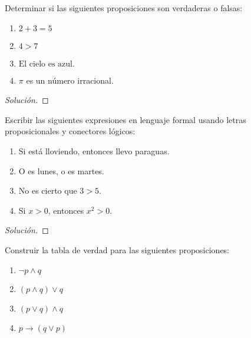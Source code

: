 \documentclass[a4,11pt]{aleph-notas}
\begin{document}
\encabezado

\begin{ejer}
    Determinar si las siguientes proposiciones son verdaderas o falsas:
    \begin{multicols}{2}
    \begin{enumerate}[label=\textit{\alph*)}]
        \item $2 + 3 = 5$
        \item $4 > 7$
        \item $\text{El cielo es azul.}$
        \item $\pi$ es un número irracional.
    \end{enumerate}
    \end{multicols}
\end{ejer}

\begin{proof}[Solución]\hspace{0pt}
    
\end{proof}

\begin{ejer}
    Escribir las siguientes expresiones en lenguaje formal usando letras proposicionales y conectores lógicos:
    \begin{enumerate}[label=\textit{\alph*)}]
        \item Si está lloviendo, entonces llevo paraguas.
        \item O es lunes, o es martes.
        \item No es cierto que $3 > 5$.
        \item Si $x > 0$, entonces $x^2 > 0$.
    \end{enumerate}
\end{ejer}

\begin{proof}[Solución]\hspace{0pt}
    
\end{proof}

\begin{ejer}
    Construir la tabla de verdad para las siguientes proposiciones:
    \begin{multicols}{2}
    \begin{enumerate}[label=\textit{\alph*)}]
        \item $\neg p \land q$
        \item $(p \land q) \lor q$
        \item $(p \lor q) \land q$
        \item $p \rightarrow (q \lor p)$
    \end{enumerate}
    \end{multicols}
    \vspace{0pt}
\end{ejer}
\end{document}

